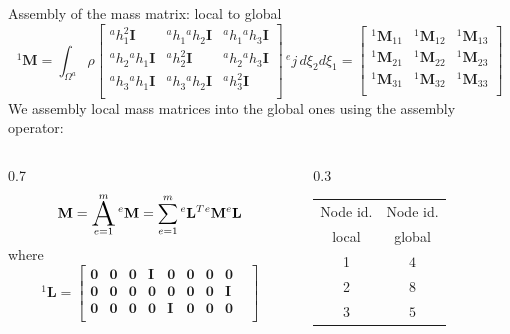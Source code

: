\documentclass[aspectratio=169]{beamer}
\begin{document}
{  \begin{frame}{Assembly of the mass matrix: local to global}
      \vspace{-0.7cm}
      $$
          {}^1\mathbf M
          = \int_{\Omega^a} \rho\begin{bmatrix}
              {}^a h_1^2 \mathbf I      & {}^a h_1{}^a h_2 \mathbf I & {}^a h_1{}^a h_3 \mathbf I \\
              {}^ah_2{}^a h_1 \mathbf I & {}^a h_2^2 \mathbf I       & {}^a h_2{}^a h_3 \mathbf I \\
              {}^ah_3{}^a h_1 \mathbf I & {}^a h_3{}^a h_2 \mathbf I & {}^a h_3^2 \mathbf I       \\
          \end{bmatrix} \, {}^ej \, d\xi_2d\xi_1=\begin{bmatrix}
              {}^1\mathbf M_{11} & {}^1\mathbf M_{12} & {}^1\mathbf M_{13} \\
              {}^1\mathbf M_{21} & {}^1\mathbf M_{22} & {}^1\mathbf M_{23} \\
              {}^1\mathbf M_{31} & {}^1\mathbf M_{32} & {}^1\mathbf M_{33} \\
          \end{bmatrix}$$
      We assembly local mass matrices into the global ones using the assembly operator:
      \begin{columns}
          \begin{column}{0.7\textwidth}
              \vspace{0.5cm}
              $$    \mathbf M =\A_{e=1}^m {}^e\mathbf M = \sum_{e=1}^{m} {}^e\mathbf L^T {}^e\mathbf M{}^e\mathbf L$$
              \hspace{0.7cm}where
              $${}^1\mathbf L=\begin{bmatrix}
                      \mathbf 0 & \mathbf 0 & \mathbf 0 & \mathbf I & \mathbf 0 & \mathbf 0 & \mathbf 0 & \mathbf 0 & \\
                      \mathbf 0 & \mathbf 0 & \mathbf 0 & \mathbf 0 & \mathbf 0 & \mathbf 0 & \mathbf 0 & \mathbf I & \\
                      \mathbf 0 & \mathbf 0 & \mathbf 0 & \mathbf 0 & \mathbf I & \mathbf 0 & \mathbf 0 & \mathbf 0 & \\
                  \end{bmatrix}$$
          \end{column}
          \hspace{1cm}
          \begin{column}{0.3\textwidth}
              \begin{tabular}{c|c}
                  Node  id. & Node  id. \\
                  local     & global    \\\hline
                  1         & $4$       \\
                  2         & $8$       \\
                  3         & $5$       \\
              \end{tabular}
          \end{column}
      \end{columns}
  \end{frame}

}
\end{document}
